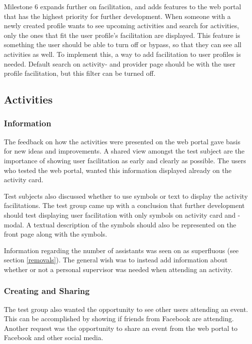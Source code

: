 Milestone 6 expands further on facilitation, and adds features to the web portal that has the highest priority for further development. When someone with a newly created profile wants to see upcoming activities and search for activities, only the ones that fit the user profile's facilitation are displayed. This feature is something the user should be able to turn off or bypass, so that they can see all activities as well. To implement this, a way to add facilitation to user profiles is needed. Default search on activity- and provider page should be with the user profile facilitation, but this filter can be turned off.

\subsection{Activities}
\subsubsection{Information}
\label{UserFeedbackAboutActivities}
The feedback on how the activities were presented on the web portal gave basis for new ideas and improvements. A shared view amongst the test subject are the importance of showing user facilitation as early and clearly as possible. The users who tested the web portal, wanted this information displayed already on the activity card.

Test subjects also discussed whether to use symbols or text to display the activity facilitations. The test group came up with a conclusion that further development should test displaying user facilitation with only symbols on activity card and -modal. A textual description of the symbols should also be represented on the front page along with the symbols.

Information regarding the number of assistants was seen on as superfluous (see section \ref{removals}). The general wish was to instead add information about whether or not a personal supervisor was needed when attending an activity.

\subsubsection{Creating and Sharing}
The test group also wanted the opportunity to see other users attending an event. This can be accomplished by showing if friends from Facebook are attending. Another request was the opportunity to share an event from the web portal to Facebook and other social media.

